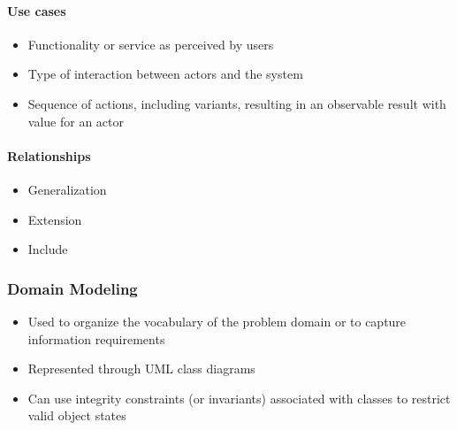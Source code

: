 \documentclass[../ESOF_notes.tex]{subfiles}
\begin{document}
\paragraph{Use cases}
\begin{itemize}
    \item Functionality or service as perceived by users
    \item Type of interaction between actors and the system
    \item Sequence of actions, including variants, resulting in an observable
    result with value for an actor
    
\end{itemize}

\paragraph{Relationships}

\begin{itemize}
    \item Generalization
    \item Extension
    \item Include
\end{itemize}

\subsubsection{Domain Modeling}
\begin{itemize}
    \item Used to organize the vocabulary of the problem domain or to capture information requirements
    \item Represented through UML class diagrams
    \item Can use integrity constraints (or invariants) associated with classes to restrict valid object states
\end{itemize}
\end{document}
